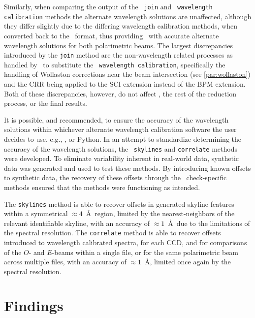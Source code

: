 Similarly, when comparing the output of the \stops\ \texttt{join} and \polsalt\ \texttt{wavelength calibration} methods the alternate wavelength solutions are unaffected, although they differ slightly due to the differing wavelength calibration methods, when converted back to the \polsalt\ format, thus providing \polsalt\ with accurate alternate wavelength solutions for both polarimetric beams.
The largest discrepancies introduced by the \texttt{join} method are the non-wavelength related processes as handled by \stops\ to substitute the \polsalt\ \texttt{wavelength calibration}, specifically the handling of Wollaston corrections near the beam intersection (see \autoref{par:wollaston}) and the \gls{CRR} being applied to the \gls{SCI} extension instead of the \gls{BPM} extension.
Both of these discrepancies, however, do not affect \polsalt, the rest of the reduction process, or the final results.

It is possible, and recommended, to ensure the accuracy of the wavelength solutions within whichever alternate wavelength calibration software the user decides to use, e.g., \iraf, or Python.
In an attempt to standardize determining the accuracy of the wavelength solutions, the \stops\ \texttt{skylines} and \texttt{correlate} methods were developed.
To eliminate variability inherent in real-world data, synthetic data was generated and used to test these methods.
By introducing known offsets to synthetic data, the recovery of these offsets through the \stops\ check-specific methods ensured that the methods were functioning as intended.

The \texttt{skylines} method is able to recover offsets in generated skyline features within a symmetrical $\approx4$~\AA\ region, limited by the nearest-neighbors of the relevant identifiable skyline, with an accuracy of $\approx1$~\AA\ due to the limitations of the spectral resolution.
The \texttt{correlate} method is able to recover offsets introduced to wavelength calibrated spectra, for each \gls{CCD}, and for comparisons of the $O$- and $E$-beams within a single file, or for the same polarimetric beam across multiple files, with an accuracy of $\approx1$~\AA, limited once again by the spectral resolution.

\section{Findings} \label{sec:findings}

